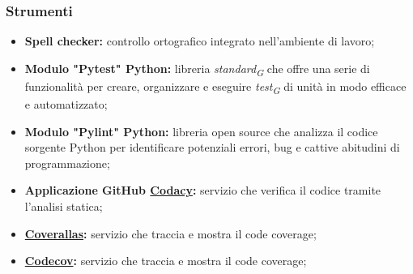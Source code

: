 \hypertarget{subsubsec:strumentiVerifica}{\subsubsection{Strumenti}}
\begin{itemize}
    \item \textbf{Spell checker:} 
        controllo ortografico integrato nell’ambiente di lavoro;
    \item \textbf{Modulo "Pytest" Python:} libreria \textit{standard}\textsubscript{\textit{G}} che offre una serie di funzionalità per creare, organizzare e eseguire \textit{test}\textsubscript{\textit{G}} di unità in modo efficace e automatizzato;
    \item \textbf{Modulo "Pylint" Python:} libreria open source che analizza il codice sorgente Python per identificare potenziali errori, bug e cattive abitudini di programmazione;
    \item \textbf{Applicazione GitHub \href{https://github.com/marketplace/codacy}{Codacy}:} servizio che verifica il codice tramite l'analisi statica;
    \item \textbf{\href{https://github.com/marketplace/actions/coveralls-github-action}{Coverallas}:} servizio che traccia e mostra il code coverage;
    \item \textbf{\href{https://github.com/marketplace/actions/codecov}{Codecov}:} servizio che traccia e mostra il code coverage;
\end{itemize}
